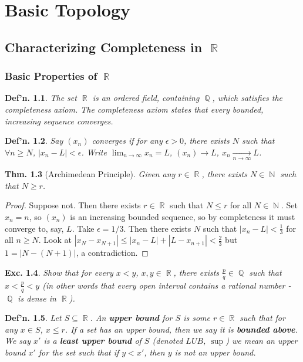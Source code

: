 \documentclass[12pt, a4paper]{book}
\DeclareMathOperator{\N}{\mathbb{N}}
\DeclareMathOperator{\Q}{\mathbb{Q}}
\DeclareMathOperator{\R}{\mathbb{R}}
\newtheorem{theorem}{Thm.}[section]
\newtheorem{definition}[theorem]{Def'n.}
\newtheorem{exercise}[theorem]{Exc.}
\theoremstyle{nonumberplain}
\newtheorem{proof}{Proof}
\begin{document}
\chapter{Basic Topology}
\section{Characterizing Completeness in $\R$}
\subsection{Basic Properties of $\R$}
\begin{definition}
    The set $\R$ is an ordered field, containing $\Q$, which satisfies the completeness axiom. The completeness axiom states
    that every bounded, increasing sequence converges.
\end{definition}
\begin{definition}
    Say $(x_n)$ converges if for any $\epsilon>0$, there exists $N$ such that $\forall n\geq N$, $|x_n-L|<\epsilon$.
    Write $\lim_{n\to\infty}x_n=L$, $(x_n)\to L$, $x_n\underset{n\to\infty}{\to}L$.
\end{definition}
\begin{theorem}[Archimedean Principle]
    Given any $r\in\R$, there exists $N\in\N$ such that $N\geq r$.
\end{theorem}
\begin{proof}
    Suppose not. Then there exists $r\in\R$ such that $N\leq r$ for all $N\in\N$. Set $x_n=n$, so $(x_n)$ is an increasing
    bounded sequence, so by completeness it must converge to, say, $L$. Take $\epsilon=1/3$. Then there exists $N$ such that
    $|x_n-L|<\frac{1}{3}$ for all $n\geq N$. Look at $|x_N-x_{N+1}|\leq|x_n-L|+|L-x_{n+1}|<\frac{2}{3}$ but $1=|N-(N+1)|$,
    a contradiction.
\end{proof}
\begin{exercise}
    Show that for every $x<y$, $x,y\in\R$, there exists $\frac{p}{q}\in\Q$ such that $x<\frac{p}{q}<y$ (in other words that
    every open interval contains a rational number - $\Q$ is dense in $\R$).
\end{exercise}
\begin{definition}
    Let $S\subseteq\R$. An \textbf{upper bound} for $S$ is some $r\in\R$ such that for any $x\in S$, $x\leq r$. If a set has an upper bound,
    then we say it is \textbf{bounded above}. We say $x'$ is a \textbf{least upper bound} of $S$ (denoted $LUB$, $\sup$)
    we mean an upper bound $x'$ for the set such that if $y<x'$, then $y$ is not an upper bound.
\end{definition}
\end{document}
